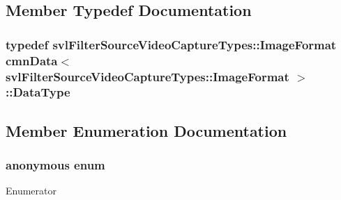 \subsection{Member Typedef Documentation}
\hypertarget{classcmn_data_3_01svl_filter_source_video_capture_types_1_1_image_format_01_4_addfc3b80307fd56e73fbbf1f6eb63edb}{
\subsubsection[{Data\-Type}]{\setlength{\rightskip}{0pt plus 5cm}typedef {\bf svl\-Filter\-Source\-Video\-Capture\-Types\-::\-Image\-Format} {\bf cmn\-Data}$<$ {\bf svl\-Filter\-Source\-Video\-Capture\-Types\-::\-Image\-Format} $>$\-::{\bf Data\-Type}}}\label{classcmn_data_3_01svl_filter_source_video_capture_types_1_1_image_format_01_4_addfc3b80307fd56e73fbbf1f6eb63edb}


\subsection{Member Enumeration Documentation}
\hypertarget{classcmn_data_3_01svl_filter_source_video_capture_types_1_1_image_format_01_4_aa7ad497c4ee45ff0b87968cf884db467}{\subsubsection[{anonymous enum}]{\setlength{\rightskip}{0pt plus 5cm}anonymous enum}}\label{classcmn_data_3_01svl_filter_source_video_capture_types_1_1_image_format_01_4_aa7ad497c4ee45ff0b87968cf884db467}
\begin{Desc}
\item[Enumerator]\par
\begin{description}
\item[{\em 
\hypertarget{classcmn_data_3_01svl_filter_source_video_capture_types_1_1_image_format_01_4_aa7ad497c4ee45ff0b87968cf884db467abf991dde75ea0e092b74b6405ec0e683}{I\-S\-\_\-\-S\-P\-E\-C\-I\-A\-L\-I\-Z\-E\-D}\label{classcmn_data_3_01svl_filter_source_video_capture_types_1_1_image_format_01_4_aa7ad497c4ee45ff0b87968cf884db467abf991dde75ea0e092b74b6405ec0e683}
}]\end{description}
\end{Desc}


